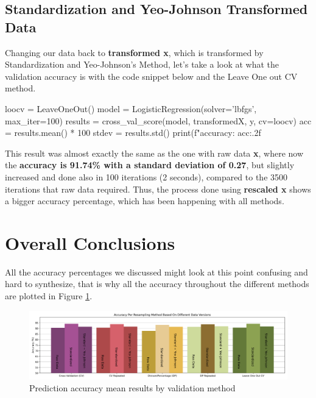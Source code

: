 \documentclass[11pt]{article}
\begin{document}
\subsection{Standardization and Yeo-Johnson Transformed Data}

Changing our data back to \textbf{transformed x}, which is transformed by Standardization and Yeo-Johnson's Method, let's take a look at what the validation accuracy is with the code snippet below and the Leave One out CV method.
\\

\begin{python}
loocv = LeaveOneOut()
model = LogisticRegression(solver='lbfgs', max_iter=100)
results = cross_val_score(model, transformedX, y, cv=loocv)
acc = results.mean() * 100
stdev = results.std()
print(f"accuracy: {acc:.2f}%
\end{python}

This result was almost exactly the same as the one with raw data \textbf{x}, where now the \textbf{accuracy is  91.74\% with a standard deviation of 0.27}, but slightly increased and done also in 100 iterations (2 seconds), compared to the 3500 iterations that raw data required. Thus, the process done using \textbf{rescaled x} shows a bigger accuracy percentage, which has been happening with all methods.

\section{Overall Conclusions}

All the accuracy percentages we discussed might look at this point confusing and hard to synthesize, that is why all the accuracy throughout the different methods are plotted in Figure \ref{fig:bars}.
\\

\begin{figure}[!ht]
\centering
    \includegraphics[width=7in]{acc-plot2.png}
    \caption{Prediction accuracy mean results by validation method}
    \label{fig:bars}
\end{figure}
\end{document}
